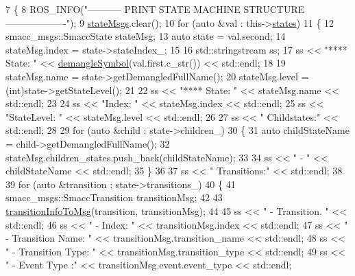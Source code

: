 \begin{DoxyCode}
7 \{
8     ROS\_INFO(\textcolor{stringliteral}{"----------- PRINT STATE MACHINE STRUCTURE -------------------"});
9     \hyperlink{classsmacc_1_1SmaccStateMachineInfo_aac401ecee7b25676a316e3dbdc680af8}{stateMsgs}.clear();
10     \textcolor{keywordflow}{for} (\textcolor{keyword}{auto} &val : this->\hyperlink{classsmacc_1_1SmaccStateMachineInfo_a8d6f1a9ce60f39835e7aa2179139977f}{states})
11     \{
12         smacc\_msgs::SmaccState stateMsg;
13         \textcolor{keyword}{auto} state = val.second;
14         stateMsg.index = state->stateIndex\_;
15 
16         std::stringstream ss;
17         ss << \textcolor{stringliteral}{"**** State: "} << \hyperlink{namespacesmacc_a458f5e70d468824fbcd66cc7729deaa8}{demangleSymbol}(val.first.c\_str()) << std::endl;
18 
19         stateMsg.name = state->getDemangledFullName();
20         stateMsg.level = (int)state->getStateLevel();
21 
22         ss << \textcolor{stringliteral}{"**** State: "} << stateMsg.name << std::endl;
23 
24         ss << \textcolor{stringliteral}{"Index: "} << stateMsg.index << std::endl;
25         ss << \textcolor{stringliteral}{"StateLevel: "} << stateMsg.level << std::endl;
26 
27         ss << \textcolor{stringliteral}{" Childstates:"} << std::endl;
28 
29         \textcolor{keywordflow}{for} (\textcolor{keyword}{auto} &child : state->children\_)
30         \{
31             \textcolor{keyword}{auto} childStateName = child->getDemangledFullName();
32             stateMsg.children\_states.push\_back(childStateName);
33 
34             ss << \textcolor{stringliteral}{" - "} << childStateName << std::endl;
35         \}
36 
37         ss << \textcolor{stringliteral}{" Transitions:"} << std::endl;
38 
39         \textcolor{keywordflow}{for} (\textcolor{keyword}{auto} &transition : state->transitions\_)
40         \{
41             smacc\_msgs::SmaccTransition transitionMsg;
42 
43             \hyperlink{namespacesmacc_a6cda75a51f4a5e29d0a64effb800fb61}{transitionInfoToMsg}(transition, transitionMsg);
44 
45             ss << \textcolor{stringliteral}{" - Transition.  "} << std::endl;
46             ss << \textcolor{stringliteral}{"      - Index: "} << transitionMsg.index << std::endl;
47             ss << \textcolor{stringliteral}{"      - Transition Name: "} << transitionMsg.transition\_name << std::endl;
48             ss << \textcolor{stringliteral}{"      - Transition Type: "} << transitionMsg.transition\_type << std::endl;
49             ss << \textcolor{stringliteral}{"      - Event Type :"} << transitionMsg.event.event\_type << std::endl;

\end{DoxyCode}
